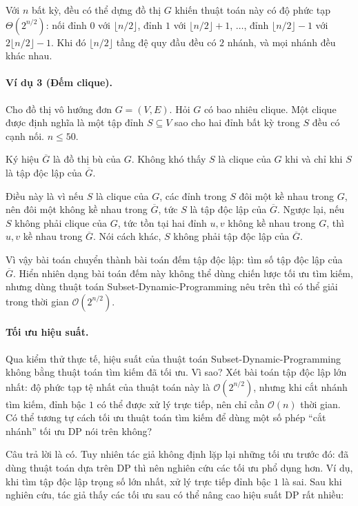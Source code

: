 \documentclass[11pt]{article}
\newcommand{\Oh}{\mathcal{O}}
\begin{document}
Với \(n\) bất kỳ, đều có thể dựng đồ thị \(G\) khiến thuật toán này có độ phức
tạp \(\Theta(2^{n/2})\): nối đỉnh \(0\) với \(\lfloor n/2\rfloor\), đỉnh \(1\)
với \(\lfloor n/2\rfloor+1\), \(\ldots\), đỉnh \(\lfloor n/2\rfloor-1\) với
\(2\lfloor n/2\rfloor-1\). Khi đó \(\lfloor n/2\rfloor\) tầng đệ quy đầu đều
có \(2\) nhánh, và mọi nhánh đều khác nhau.

\paragraph{Ví dụ 3 (Đếm clique).}
Cho đồ thị vô hướng đơn \(G=(V,E)\). Hỏi \(G\) có bao nhiêu clique. Một clique
được định nghĩa là một tập đỉnh \(S\subseteq V\) sao cho hai đỉnh bất kỳ trong
\(S\) đều có cạnh nối. \(n\le 50\).

Ký hiệu \(\overline G\) là đồ thị bù của \(G\). Không khó thấy \(S\) là clique
của \(G\) khi và chỉ khi \(S\) là tập độc lập của \(\overline G\).

Điều này là vì nếu \(S\) là clique của \(G\), các đỉnh trong \(S\) đôi một kề
nhau trong \(G\), nên đôi một không kề nhau trong \(\overline G\), tức \(S\) là
tập độc lập của \(\overline G\). Ngược lại, nếu \(S\) không phải clique của
\(G\), tức tồn tại hai đỉnh \(u,v\) không kề nhau trong \(G\), thì \(u,v\) kề
nhau trong \(\overline G\). Nói cách khác, \(S\) không phải tập độc lập của
\(\overline G\).

Vì vậy bài toán chuyển thành bài toán đếm tập độc lập: tìm số tập độc lập của
\(\overline G\). Hiển nhiên dạng bài toán đếm này không thể dùng chiến lược tối
ưu tìm kiếm, nhưng dùng thuật toán Subset-Dynamic-Programming nêu trên thì có
thể giải trong thời gian \(\Oh(2^{n/2})\).

\paragraph{Tối ưu hiệu suất.}
Qua kiểm thử thực tế, hiệu suất của thuật toán Subset-Dynamic-Programming không
bằng thuật toán tìm kiếm đã tối ưu. Vì sao? Xét bài toán tập độc lập lớn nhất:
độ phức tạp tệ nhất của thuật toán này là \(\Oh(2^{n/2})\), nhưng khi cắt
nhánh tìm kiếm, đỉnh bậc \(1\) có thể được xử lý trực tiếp, nên chỉ cần
\(\Oh(n)\) thời gian. Có thể tương tự cách tối ưu thuật toán tìm kiếm để dùng
một số phép ``cắt nhánh'' tối ưu DP nói trên không?

Câu trả lời là có. Tuy nhiên tác giả không định lặp lại những tối ưu trước đó:
đã dùng thuật toán dựa trên DP thì nên nghiên cứu các tối ưu phổ dụng hơn. Ví
dụ, khi tìm tập độc lập trọng số lớn nhất, xử lý trực tiếp đỉnh bậc \(1\) là
sai. Sau khi nghiên cứu, tác giả thấy các tối ưu sau có thể nâng cao hiệu suất
DP rất nhiều:
\end{document}
